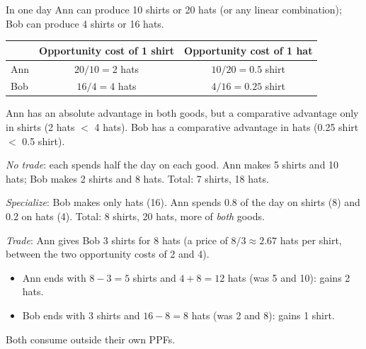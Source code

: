 \begin{example}
In one day Ann can produce 10 shirts or 20 hats (or any linear combination); Bob can
produce 4 shirts or 16 hats.
\begin{center}
\begin{tabular}{lcc}
\toprule
 & Opportunity cost of 1 shirt & Opportunity cost of 1 hat \\
\midrule
Ann & $20/10 = 2$ hats & $10/20 = 0.5$ shirt \\
Bob & $16/4 = 4$ hats & $4/16 = 0.25$ shirt \\
\bottomrule
\end{tabular}
\end{center}
Ann has an absolute advantage in both goods, but a comparative advantage only in shirts
(2 hats $<$ 4 hats). Bob has a comparative advantage in hats (0.25 shirt $<$ 0.5 shirt).

\emph{No trade}: each spends half the day on each good. Ann makes 5 shirts and 10 hats;
Bob makes 2 shirts and 8 hats. Total: 7 shirts, 18 hats.

\emph{Specialize}: Bob makes only hats (16). Ann spends 0.8 of the day on shirts (8) and
0.2 on hats (4). Total: 8 shirts, 20 hats, more of \emph{both} goods.

\emph{Trade}: Ann gives Bob 3 shirts for 8 hats (a price of $8/3 \approx 2.67$ hats per
shirt, between the two opportunity costs of 2 and 4).
\begin{itemize}
  \item Ann ends with $8-3 = 5$ shirts and $4+8 = 12$ hats (was 5 and 10): gains 2 hats.
  \item Bob ends with 3 shirts and $16-8 = 8$ hats (was 2 and 8): gains 1 shirt.
\end{itemize}
Both consume outside their own PPFs.
\end{example}

\begin{center}
\end{center}

